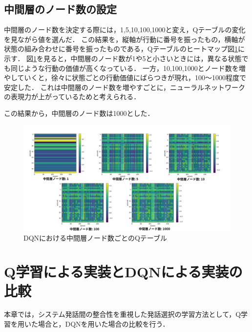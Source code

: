 \documentclass[a4j,dvipdfmx]{jarticle}
\begin{document}
\subsection{中間層のノード数の設定}%
中間層のノード数を決定する際には，1,5,10,100,1000と変え，Qテーブルの変化を見ながら値を選んだ．
この結果を，縦軸が行動に番号を振ったもの，横軸が状態の組み合わせに番号を振ったものである，Qテーブルのヒートマップ図\ref{tyukanso}に示す．
図\ref{tyukanso}を見ると，中間層のノード数が1や5と小さいときには，異なる状態でも同じような行動の価値が高くなっている．
一方，10,100,1000とノード数を増やしていくと，徐々に状態ごとの行動価値にばらつきが現れ，100〜1000程度で安定した．
これは中間層のノード数を増やすごとに，ニューラルネットワークの表現力が上がっているためと考えられる．

この結果から，中間層のノード数は1000とした．

\begin{figure}[htb]
    \centering
    \includegraphics[width=\hsize]{tyukanso.jpg}
    \caption{DQNにおける中間層ノード数ごとのQテーブル}
    \label{tyukanso}
\end{figure}


\section{Q学習による実装とDQNによる実装の比較}
本章では，システム発話間の整合性を重視した発話選択の学習方法として，Q学習を用いた場合と，DQNを用いた場合の比較を行う．
\end{document}

